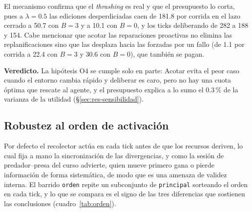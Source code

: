 El mecanismo confirma que el \emph{thrashing} es real y que el presupuesto lo corta, pues a $\lambda=0.5$ las ediciones desperdiciadas caen de 181.8 por corrida en el lazo cerrado a 50.7 con $B=3$ y a 10.1 con $B=0$, y los ticks deliberando de 282 a 188 y 154. Cabe mencionar que acotar las reparaciones proactivas no elimina las replanificaciones sino que las desplaza hacia las forzadas por un fallo (de 1.1 por corrida a 22.4 con $B=3$ y 30.6 con $B=0$), que también se pagan.

\textbf{Veredicto.} La hipótesis O4 se cumple solo en parte: Acotar evita el peor caso cuando el entorno cambia rápido y deliberar es caro, pero no hay una cuota óptima que rescate al agente, y el presupuesto explica a lo sumo el 0.3\,\% de la varianza de la utilidad (§\ref{sec:res-sensibilidad}).

\FloatBarrier
\subsection{Robustez al orden de activación}\label{sec:res-orden}

Por defecto el recolector actúa en cada tick antes de que los recursos deriven, lo cual fija a mano la sincronización de las divergencias, y como la sesión de predador–presa del curso advierte, quien mueve primero gana o pierde información de forma sistemática, de modo que es una amenaza de validez interna. El barrido \texttt{orden} repite un subconjunto de \texttt{principal} sorteando el orden en cada tick, y lo que se compara es el signo de las tres diferencias que sostienen las conclusiones (cuadro~\ref{tab:orden}).

